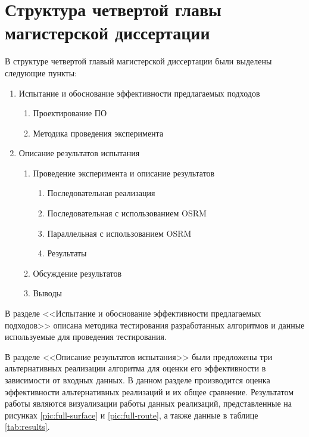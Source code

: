 \documentclass[a4paper, 14pt]{extreport}
\begin{document}
    \chapter{Структура четвертой главы магистерской диссертации}
    В структуре четвертой главый магистерской диссертации были выделены следующие пункты:
    \begin{enumerate}
        \item Испытание и обоснование эффективности предлагаемых подходов
        \begin{enumerate}
            \item Проектирование ПО
            \item Методика проведения эксперимента
        \end{enumerate}
        \item Описание результатов испытания
        \begin{enumerate}
            \item Проведение эксперимента и описание результатов
            \begin{enumerate}
                \item Последовательная реализация
                \item Последовательная с использованием OSRM
                \item Параллельная с использованием OSRM
                \item Результаты
            \end{enumerate}
            \item Обсуждение результатов
            \item Выводы
        \end{enumerate}
    \end{enumerate}

    В разделе <<Испытание и обоснование эффективности предлагаемых подходов>> описана методика тестирования 
    разработанных алгоритмов и данные используемые для проведения тестирования.

    В разделе <<Описание результатов испытания>> были предложены три альтернативных реализации алгоритма для оценки его 
    эффективности в зависимости от входных данных. В данном разделе производится оценка эффективности альтернативных 
    реализаций и их общее сравнение. Результатом работы являются визуализации работы данных реализаций, представленные 
    на рисунках \ref{pic:full-surface} и \ref{pic:full-route}, а также данные в таблице \ref{tab:results}.
\end{document}
